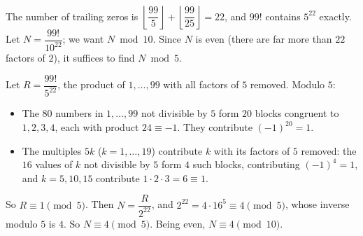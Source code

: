 The number of trailing zeros is $\left\lfloor\dfrac{99}5\right\rfloor+\left\lfloor\dfrac{99}{25}\right\rfloor=22$, and $99!$ contains $5^{22}$ exactly. Let $N=\dfrac{99!}{10^{22}}$; we want $N\bmod10$. Since $N$ is even (there are far more than $22$ factors of $2$), it suffices to find $N\bmod5$.

Let $R=\dfrac{99!}{5^{22}}$, the product of $1,\dots,99$ with all factors of $5$ removed. Modulo $5$:
\begin{itemize}
\item The $80$ numbers in $1,\dots,99$ not divisible by $5$ form $20$ blocks congruent to $1,2,3,4$, each with product $24\equiv-1$. They contribute $(-1)^{20}=1$.
\item The multiples $5k$ ($k=1,\dots,19$) contribute $k$ with its factors of $5$ removed: the $16$ values of $k$ not divisible by $5$ form $4$ such blocks, contributing $(-1)^4=1$, and $k=5,10,15$ contribute $1\cdot2\cdot3=6\equiv1$.
\end{itemize}
So $R\equiv1\pmod5$. Then $N=\dfrac{R}{2^{22}}$, and $2^{22}=4\cdot16^5\equiv4\pmod5$, whose inverse modulo $5$ is $4$. So $N\equiv4\pmod5$. Being even, $N\equiv\boxed{4}\pmod{10}$.
